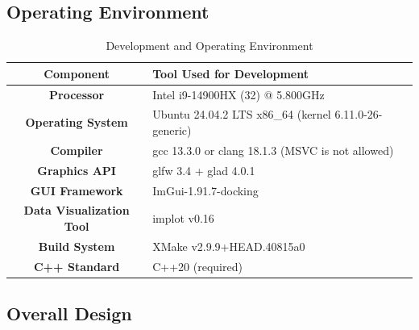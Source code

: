 \documentclass{article}
\begin{document}
\subsection{Operating Environment}
\begin{table}[H]
    \centering
    \caption{Development and Operating Environment}
    \begin{tabular}{@{}>{\bfseries}c>{\raggedright\arraybackslash}p{10cm}@{}} %
        \toprule
        \textbf{Component}      & \textbf{Tool Used for Development}                    \\
        \midrule
        Processor               & Intel i9-14900HX (32) @ 5.800GHz                      \\
        Operating System        & Ubuntu 24.04.2 LTS x86\_64 (kernel 6.11.0-26-generic) \\
        Compiler                & gcc 13.3.0 or clang 18.1.3 (MSVC is not allowed)      \\
        Graphics API            & glfw 3.4 + glad 4.0.1                                 \\
        GUI Framework           & ImGui-1.91.7-docking                                  \\
        Data Visualization Tool & implot v0.16                                          \\
        Build System            & XMake v2.9.9+HEAD.40815a0                             \\
        C++ Standard            & C++20 (required)                                      \\
        \bottomrule
    \end{tabular}
\end{table}
\subsection{Overall Design}
\end{document}
